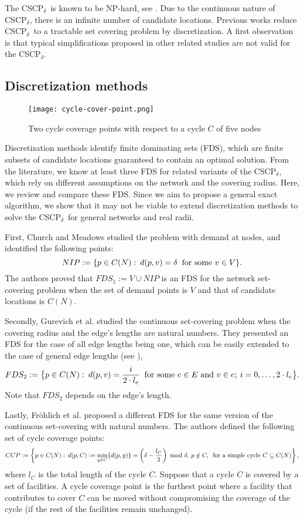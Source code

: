 \documentclass[review]{elsarticle}
\newcommand{\dlt}{{\delta}}
\newcommand{\problem}{CSCP$_\dlt$}
\theoremstyle{definition}
\begin{document}
The \problem\ is known to be NP-hard, see \cite{Hartmann21}.  Due to the continuous nature of \problem, there is an infinite number of candidate  locations. Previous works reduce \problem\ to a tractable set covering problem by discretization. A first observation is that typical simplifications proposed in other related studies are not valid for the \problem.

\subsection{Discretization methods}
\label{sub.disc}


\begin{figure}
	\centering
	\texttt{[image: cycle-cover-point.png]}
	\caption{Two cycle coverage points with respect to a cycle $C$ of five nodes}
	\label{fig:cycle-cover}
\end{figure}
Discretization methods identify finite dominating sets (FDS), which are finite subsets of candidate locations guaranteed to contain an optimal solution. %
From the literature, we know at least three FDS for related variants of the \problem, which rely on different assumptions on the network and the covering radius. Here, we review and compare these FDS. Since we aim to propose a general exact algorithm, we show that it may not be viable to extend discretization methods to solve the \problem\ for general networks and real radii.

First, Church and Meadows \cite{Church79} studied the problem with demand at nodes, and identified the following points:
$$NIP:=\{p\in C(N):\: d(p,v)=\dlt \:\textup{ for some }v\in V \}.$$
The authors proved that $FDS_1:=V\cup NIP$ is an FDS for the network set-covering problem when the set of demand points is $V$ and that of candidate locations is $C(N)$.

Secondly, Gurevich et al. \cite{Gurevich84} studied the continuous set-covering problem  when the covering radius and the edge’s lengths are natural numbers. They presented an FDS for the case of all edge lengths being one, which can be easily extended to the case of general edge lengths (see \cite{Hamacher20}),
$$FDS_2:=\big\{p\in C(N):\: d(p,v)=\frac{i}{2\cdot l_e} \:\textup{ for some }e\in E\textup{ and } v\in e;\: i=0,\ldots,2\cdot l_e\big\}.$$
Note that $FDS_2$ depends on the edge's length.

Lastly,  Fr\"ohlich et al. \cite{Hamacher20} proposed a different FDS for the same version of the continuous set-covering with natural numbers. The authors defined the following set of cycle coverage points:
$$CCP:=\left\{p\in C(N):\: d(p,C):=\min_{y\in C}\{d(p,y)\}=\left(\dlt-\frac{l_C}{2}\right)\textup{ mod } \dlt, \:p\notin C,\:\textup{ for a simple cycle }C\subseteq C(N)\right\},$$
where $l_C$ is the total length of the cycle $C$. Suppose that a cycle $C$ is covered by a set of facilities. A cycle coverage point is the furthest point where a facility that contributes to cover $C$ can be moved without compromising the coverage of the cycle (if the rest of the facilities remain unchanged).
\end{document}
